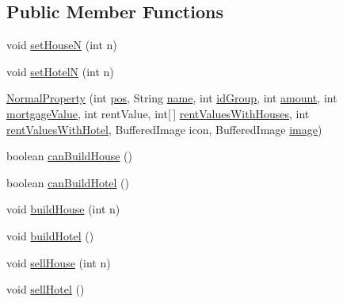 \subsection*{Public Member Functions}
\begin{DoxyCompactItemize}
\item 
void \hyperlink{class_monopoly_1_1_logic_1_1_normal_property_acaf1b55e111dd745464a06cab032a229}{set\+HouseN} (int n)
\item 
void \hyperlink{class_monopoly_1_1_logic_1_1_normal_property_ac3d5af5d9d951c615c554e3653f53f86}{set\+HotelN} (int n)
\item 
\hyperlink{class_monopoly_1_1_logic_1_1_normal_property_a175bcb0bb1aa6eab66ba1c8289286da6}{Normal\+Property} (int \hyperlink{class_monopoly_1_1_logic_1_1_board_box_a750c8300a134809e0eb5772b3ba92258}{pos}, String \hyperlink{class_monopoly_1_1_logic_1_1_board_box_ad5cd8d9fc191dc2df82b9fe7766210fd}{name}, int \hyperlink{class_monopoly_1_1_logic_1_1_property_ab42a31cd99e909728aa49c0184f644b8}{id\+Group}, int \hyperlink{class_monopoly_1_1_logic_1_1_property_a3e5525c94c56e900372c5a13a8fe03fb}{amount}, int \hyperlink{class_monopoly_1_1_logic_1_1_property_ae4b874ede5de05f1f5b0ab329c2c58f5}{mortgage\+Value}, int rent\+Value, int\mbox{[}$\,$\mbox{]} \hyperlink{class_monopoly_1_1_logic_1_1_normal_property_a918c6693fd0638db23698322ae3fdad3}{rent\+Values\+With\+Houses}, int \hyperlink{class_monopoly_1_1_logic_1_1_normal_property_af1d8fcccf72faa5a718594967213ba55}{rent\+Values\+With\+Hotel}, Buffered\+Image icon, Buffered\+Image \hyperlink{class_monopoly_1_1_logic_1_1_property_a1bd3d29f02147192157c57535fd0eca9}{image})
\item 
boolean \hyperlink{class_monopoly_1_1_logic_1_1_normal_property_ae0ce0c684f69d273faca595038f22fee}{can\+Build\+House} ()
\item 
boolean \hyperlink{class_monopoly_1_1_logic_1_1_normal_property_a35f3a983925352f7f4638288b458f918}{can\+Build\+Hotel} ()
\item 
void \hyperlink{class_monopoly_1_1_logic_1_1_normal_property_aaca96e1c246e9dbd9f31e26a5f849343}{build\+House} (int n)
\item 
void \hyperlink{class_monopoly_1_1_logic_1_1_normal_property_a5c8250cb6aa2761da7ac9b82a2da0453}{build\+Hotel} ()
\item 
void \hyperlink{class_monopoly_1_1_logic_1_1_normal_property_a12bd1cd22b4331260ffe4b4a71750218}{sell\+House} (int n)
\item 
void \hyperlink{class_monopoly_1_1_logic_1_1_normal_property_a878ab4447f7ca1c98d879f19521404a6}{sell\+Hotel} ()

\end{DoxyCompactItemize}
